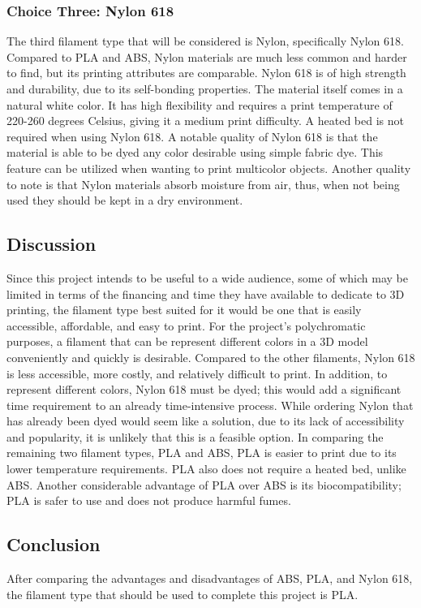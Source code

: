 \documentclass[letterpaper, onecolumn, draftclsnofoot,10pt, compsoc]{IEEEtran}
\begin{document}
\begin{singlespace}
\subsubsection{Choice Three: Nylon 618}
The third filament type that will be considered is Nylon, specifically Nylon 618. 
Compared to PLA and ABS, Nylon materials are much less common and harder to find, but its printing attributes are comparable.
Nylon 618 is of high strength and durability, due to its self-bonding properties. 
The material itself comes in a natural white color. 
It has high flexibility and requires a print temperature of 220-260 degrees Celsius, giving it a medium print difficulty. 
A heated bed is not required when using Nylon 618.
A notable quality of Nylon 618 is that the material is able to be dyed any color desirable using simple fabric dye. 
This feature can be utilized when wanting to print multicolor objects. 
Another quality to note is that Nylon materials absorb moisture from air, thus, when not being used they should be kept in a dry environment. \cite{filamentweb}

\subsection{Discussion}
Since this project intends to be useful to a wide audience, some of which may be limited in terms of the financing and time they have available to dedicate to 3D printing, the filament type best suited for it would be one that is easily accessible, affordable, and easy to print.
For the project's polychromatic purposes, a filament that can be represent different colors in a 3D model conveniently and quickly is desirable.
Compared to the other filaments, Nylon 618 is less accessible, more costly, and relatively difficult to print.
In addition, to represent different colors, Nylon 618 must be dyed; this would add a significant time requirement to an already time-intensive process.
While ordering Nylon that has already been dyed would seem like a solution, due to its lack of accessibility and popularity, it is unlikely that this is a feasible option.
In comparing the remaining two filament types, PLA and ABS, PLA is easier to print due to its lower temperature requirements. 
PLA also does not require a heated bed, unlike ABS. 
Another considerable advantage of PLA over ABS is its biocompatibility; PLA is safer to use and does not produce harmful fumes.
\subsection{Conclusion}
After comparing the advantages and disadvantages of ABS, PLA, and Nylon 618, the filament type that should be used to complete this project is PLA.


\end{singlespace}
\end{document}
